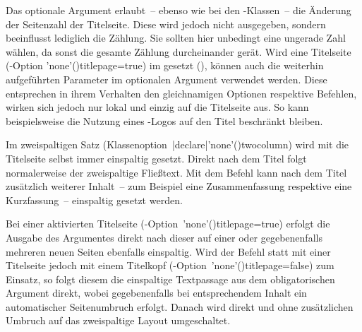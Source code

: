 \begin{DeclareEntity*}{}
\begin{DeclareEntity*}{}
\begin{DeclareEntity*}{}
\begin{Declaration}
\begin{Declaration}
\begin{Declaration}
\begin{Declaration}
\begin{Declaration}
\begin{Declaration}
\begin{Declaration}
\begin{Declaration}
\begin{Declaration}
\begin{Declaration}
\begin{Declaration}
Das optionale Argument erlaubt~-- ebenso wie bei den \KOMAScript-Klassen~-- 
die Änderung der Seitenzahl der Titelseite. Diese wird jedoch nicht ausgegeben, 
sondern beeinflusst lediglich die Zählung. Sie sollten hier unbedingt eine 
ungerade Zahl wählen, da sonst die gesamte Zählung durcheinander gerät. 
Wird eine Titelseite
(\KOMAScript-Option \Option'none'(){titlepage=true}) im 
\TUDCD gesetzt (), können auch die weiterhin aufgeführten 
Parameter im optionalen Argument verwendet werden. Diese entsprechen in ihrem 
Verhalten den gleichnamigen Optionen respektive Befehlen, wirken sich jedoch 
nur lokal und einzig auf die Titelseite aus. So kann beispielsweise die Nutzung 
eines \DDC-Logos auf den Titel beschränkt bleiben.
\end{Declaration}
\end{Declaration}
\end{Declaration}
\end{Declaration}
\end{Declaration}
\end{Declaration}
\end{Declaration}
\end{Declaration}
\end{Declaration}
\end{Declaration}
\end{Declaration}

\begin{Declaration}
  {}

Im zweispaltigen Satz 
(Klassenoption~\Option|declare|'none'(){twocolumn}) wird mit 
 die Titelseite selbst immer einspaltig gesetzt. Direkt nach 
dem Titel folgt normalerweise der zweispaltige Fließtext. Mit dem Befehl 
 kann nach dem Titel zusätzlich weiterer Inhalt~-- 
zum Beispiel eine Zusammenfassung respektive eine Kurzfassung~-- einspaltig 
gesetzt werden.

Bei einer aktivierten Titelseite 
(\KOMAScript-Option~\Option'none'(){titlepage=true}) 
erfolgt die Ausgabe des Argumentes  direkt nach 
dieser auf einer oder gegebenenfalls mehreren neuen Seiten ebenfalls 
einspaltig. Wird der Befehl  statt mit einer 
Titelseite jedoch mit einem Titelkopf 
(\KOMAScript-Option~\Option'none'(){titlepage=false}) zum 
Einsatz, so folgt diesem die einspaltige Textpassage aus dem obligatorischen 
Argument direkt, wobei gegebenenfalls bei entsprechendem Inhalt ein 
automatischer Seitenumbruch erfolgt. Danach wird direkt und ohne zusätzlichen 
Umbruch auf das zweispaltige Layout umgeschaltet.


\end{Declaration}
\end{DeclareEntity*}
\end{DeclareEntity*}
\end{DeclareEntity*}
